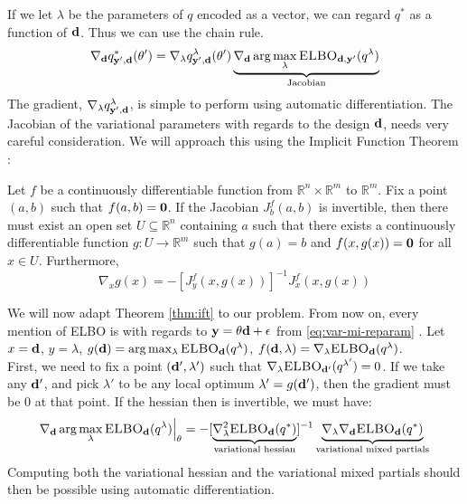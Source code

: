 If we let $\lambda$ be the parameters of $q$ encoded as a vector, we can regard $q^*$ as a function of $\mathbf{d}$.
Thus we can use the chain rule.
\begin{equation}
  \nabla_{\mathbf{d}} q^*_{\mathbf{y}', \mathbf{d}}(\theta') = \nabla_\lambda q^{\lambda}_{\mathbf{y}', \mathbf{d}}(\theta')\underbrace{\nabla_{\mathbf{d}} \arg \max_\lambda \textsc{ELBO}_{\mathbf{d}, \mathbf{y}'}(q^\lambda)}_{\textrm{Jacobian}}
\end{equation}
The gradient, $\nabla_\lambda q^\lambda_{\mathbf{y}',\mathbf{d}}$, is simple to perform using automatic differentiation.
The Jacobian of the variational parameters with regards to the design $\mathbf{d}$, needs very careful consideration. 
We will approach this using the Implicit Function Theorem \cite{lorraine19}:
\begin{theorem}
  Let $f$ be a continuously differentiable function from $\mathbb{R}^n \times \mathbb{R}^m$ to $\mathbb{R}^m$.
  Fix a point $(a, b)$ such that $f(a, b) = \mathbf{0}$. 
  If the Jacobian $J_b^{f}(a, b)$ is invertible, then there must exist an open set $U \subseteq \mathbb{R}^n$ containing $a$
  such that there exists a continuously differentiable function $g: U \rightarrow \mathbb{R}^m$ such that $g(a) = b$ and $f(x, g(x)) = \mathbf{0}$ for all $x \in U$.
  Furthermore,
  $$\nabla_{x}g(x) = -[J_y^f(x, g(x))]^{-1}J_{x}^{f}(x, g(x))$$
  \label{thm:ift}
\end{theorem}
We will now adapt Theorem \ref{thm:ift} to our problem. 
From now on, every mention of ELBO is with regards to $\mathbf{y} = \theta \mathbf{d} + \epsilon$ from \eqref{eq:var-mi-reparam} .
Let $x=\mathbf{d}$, $y=\lambda$, $g(\mathbf{d}) = \arg \max_{\lambda} \textsc{ELBO}_{\mathbf{d}}(q^{\lambda})$, $f(\mathbf{d}, \lambda) = \nabla_{\lambda}\textsc{ELBO}_{\mathbf{d}}(q^{\lambda})$.
\\
First, we need to fix a point $(\mathbf{d}', \lambda')$ such that $\nabla_{\lambda}\textsc{ELBO}_{\mathbf{d}'}(q^{\lambda'}) = 0$.
If we take any $\mathbf{d}'$, and pick $\lambda'$ to be any local optimum $\lambda' = g(\mathbf{d'})$, then the gradient must be $0$ at that point.
If the hessian then is invertible, we must have:
\begin{equation}
  \nabla_{\mathbf{d}} \arg \max_{\lambda} \textsc{ELBO}_{\mathbf{d}}(q^{\lambda})\Bigr\rvert_{\theta}= 
  -[\underbrace{\nabla^2_{\lambda} \textsc{ELBO}_{\mathbf{d}}(q^*)}_{\textrm{variational hessian}}]^{-1}
  \underbrace{\nabla_{\lambda}\nabla_{\mathbf{d}}\textsc{ELBO}_{\mathbf{d}}(q^*)}_{\textrm{variational mixed partials}}
  \label{eq:variational-jacobian}
\end{equation}
Computing both the variational hessian and the variational mixed partials should then be possible using automatic differentiation.
